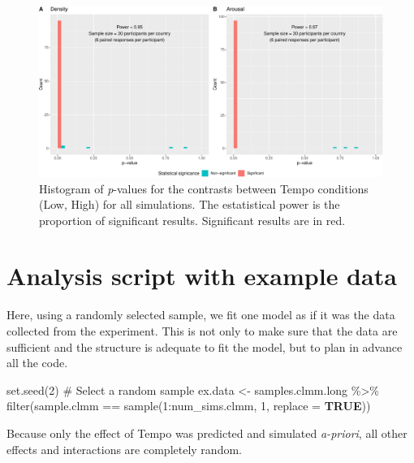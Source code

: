 \documentclass[
  bookmarksnumbered]{article}
\newenvironment{Shaded}{\begin{snugshade}}{\end{snugshade}}
\newcommand{\AttributeTok}[1]{\textcolor[rgb]{0.80,0.80,0.80}{#1}}
\newcommand{\CommentTok}[1]{\textcolor[rgb]{0.50,0.62,0.50}{#1}}
\newcommand{\ConstantTok}[1]{\textcolor[rgb]{0.86,0.64,0.64}{\textbf{#1}}}
\newcommand{\DecValTok}[1]{\textcolor[rgb]{0.86,0.86,0.80}{#1}}
\newcommand{\FunctionTok}[1]{\textcolor[rgb]{0.94,0.94,0.56}{#1}}
\newcommand{\NormalTok}[1]{\textcolor[rgb]{0.80,0.80,0.80}{#1}}
\newcommand{\OtherTok}[1]{\textcolor[rgb]{0.94,0.94,0.56}{#1}}
\newcommand{\SpecialCharTok}[1]{\textcolor[rgb]{0.86,0.64,0.64}{#1}}
\begin{document}
\begin{figure}
\centering
\includegraphics{Power_analysis_files/figure-latex/unnamed-chunk-15-1.pdf}
\caption{\label{fig:unnamed-chunk-15}Histogram of \emph{p}-values for the contrasts between Tempo conditions (Low, High) for all simulations. The estatistical power is the proportion of significant results. Significant results are in red.}
\end{figure}

\hypertarget{analysis-script-with-example-data}{%
\section{Analysis script with example data}\label{analysis-script-with-example-data}}

Here, using a randomly selected sample, we fit one model as if it was the data collected from the experiment. This is not only to make sure that the data are sufficient and the structure is adequate to fit the model, but to plan in advance all the code.

\begin{Shaded}
\begin{Highlighting}[]
\FunctionTok{set.seed}\NormalTok{(}\DecValTok{2}\NormalTok{)}
\CommentTok{\# Select a random sample}
\NormalTok{ex.data }\OtherTok{\textless{}{-}}\NormalTok{ samples.clmm.long }\SpecialCharTok{\%\textgreater{}\%}
  \FunctionTok{filter}\NormalTok{(sample.clmm }\SpecialCharTok{==} \FunctionTok{sample}\NormalTok{(}\DecValTok{1}\SpecialCharTok{:}\NormalTok{num\_sims.clmm, }\DecValTok{1}\NormalTok{, }\AttributeTok{replace =} \ConstantTok{TRUE}\NormalTok{))}
\end{Highlighting}
\end{Shaded}

Because only the effect of Tempo was predicted and simulated \emph{a-priori}, all other effects and interactions are completely random.
\end{document}
